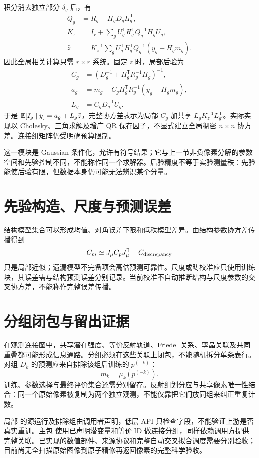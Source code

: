 积分消去独立部分 $\delta_g$ 后，有
\begin{align}
Q_g&=R_g+H_gD_gH_g^{\mathsf T},\\
K_z&=I_r+\sum_gU_g^{\mathsf T}H_g^{\mathsf T}Q_g^{-1}H_gU_g,\\
\widehat z&=K_z^{-1}\sum_gU_g^{\mathsf T}H_g^{\mathsf T}Q_g^{-1}(y_g-H_gm_g).
\end{align}
因此全局相关计算只需 $r\times r$ 系统。固定 $z$ 时，局部后验为
\begin{align}
C_g&=(D_g^{-1}+H_g^{\mathsf T}R_g^{-1}H_g)^{-1},\\
a_g&=m_g+C_gH_g^{\mathsf T}R_g^{-1}(y_g-H_gm_g),\\
L_g&=C_gD_g^{-1}U_g.
\end{align}
于是 $\mathbb E[I_g\mid y]=a_g+L_g\widehat z$，完整协方差表示为局部 $C_g$ 加共享 $L_gK_z^{-1}L_{g'}^{\mathsf T}$。实际实现以 Cholesky、三角求解及增广 QR 保存因子，不显式建立全局稠密 $n\times n$ 协方差。连接组矩阵仍受明确预算限制。

这一模块是 Gaussian 条件化，允许有符号结果；它与上一节非负像素分解的参数空间和先验控制不同，不能称作同一个求解器。后验精度不等于实验测量秩：先验能使后验有限，但数据本身仍可能无法辨识某个分量。
\section{先验构造、尺度与预测误差}
结构模型集合可以形成均值、对角误差下限和低秩模型差异。由结构参数协方差传播得到
\begin{equation}
C_m\simeq J_\mu C_pJ_\mu^{\mathsf T}+C_{\rm discrepancy}
\end{equation}
只是局部近似；遗漏模型不完备项会高估预测可靠性。尺度或畴校准应只使用训练块，其误差需与结构预测误差分别记录。当前校准不自动推断结构与尺度参数的交叉协方差，不能称作完整误差传播。
\section{分组闭包与留出证据}
在观测连接图中，共享潜在强度、等价反射轨道、Friedel 关系、孪晶关联及共同重叠都可能形成信息通路。分组必须在这些关联上闭包，不能随机拆分单条表行。对组 $D_k$ 的预测应来自排除该组后训练的 $p^{(-k)}$：
\begin{equation}
m_k=\mu_k(p^{(-k)}).
\end{equation}
训练、参数选择与最终评价集合还需分别留存。反射组划分应与共享像素唯一性结合：同一个原始像素被复制为两个独立观测，不能仅靠把它们放同组来纠正重复计数。

局部  的源运行及排除组由调用者声明，低层 API 只检查字段，不能验证上游是否真实重训。主包  使用已声明潜变量和等价 ID 做连接分组，同样依赖调用方提供完整关联。已实现的数值部件、来源协议和完整自动交叉拟合调度需要分别验收；目前尚无全扫描原始图像到原子精修再返回像素的完整科学验收。
